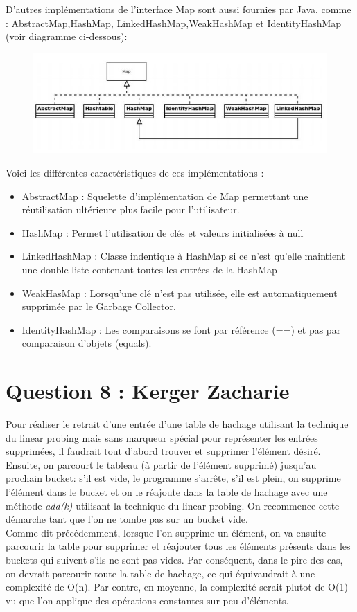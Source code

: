 \documentclass[10pt,a4paper]{article}
\begin{document}
D'autres implémentations de l'interface Map sont aussi fournies par Java, comme : AbstractMap,HashMap, LinkedHashMap,WeakHashMap et IdentityHashMap (voir diagramme ci-dessous):
\\
\begin{figure}
\centering
\includegraphics[scale=0.7]{diagramme.jpg}
\end{figure}


Voici les différentes caractéristiques de ces implémentations :
\begin{itemize}
\item AbstractMap : Squelette d'implémentation de Map permettant une réutilisation ultérieure plus facile pour l'utilisateur.
\item HashMap : Permet l'utilisation de clés et valeurs initialisées à null
\item LinkedHashMap : Classe indentique à HashMap si ce n'est qu'elle maintient une double liste contenant toutes les entrées de la HashMap
\item WeakHasMap : Lorsqu'une clé n'est pas utilisée, elle est automatiquement supprimée par le Garbage Collector.
\item IdentityHashMap : Les comparaisons se font par référence (==) et pas par comparaison d'objets (equals).
\end{itemize}

\section*{Question 8 : Kerger Zacharie}

Pour réaliser le retrait d'une entrée d'une table de hachage utilisant la technique du linear probing mais sans marqueur spécial pour représenter les entrées supprimées, il faudrait tout d'abord trouver et supprimer l'élément désiré. Ensuite, on parcourt le tableau (à partir de l'élément supprimé) jusqu'au prochain bucket: s'il est vide, le programme s'arrête, s'il est plein, on supprime l'élément dans le bucket et on le réajoute dans la table de hachage avec une méthode \emph{add(k)} utilisant la technique du linear probing. On recommence cette démarche tant que l'on ne tombe pas sur un bucket vide.\\
\newline
Comme dit précédemment, lorsque l'on supprime un élément, on va ensuite parcourir la table pour supprimer et réajouter tous les éléments présents dans les buckets qui suivent s'ils ne sont pas vides. Par conséquent, dans le pire des cas, on devrait parcourir toute la table de hachage, ce qui équivaudrait à une complexité de O(n). Par contre, en moyenne, la complexité serait plutot de O(1) vu que l'on applique des opérations constantes sur peu d'éléments.
\end{document}
